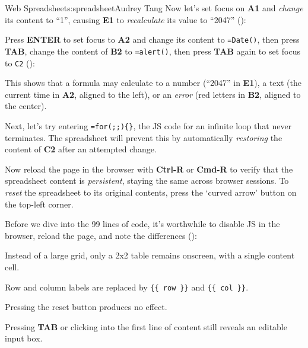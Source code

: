 \begin{aosachapter}{Web Spreadsheet}{s:spreadsheet}{Audrey Tang}
Now let's set focus on \textbf{A1} and \emph{change} its content to
``1'', causing \textbf{E1} to \emph{recalculate} its value to ``2047''
():


Press \textbf{ENTER} to set focus to \textbf{A2} and change its content
to \texttt{=Date()}, then press \textbf{TAB}, change the content of
\textbf{B2} to \texttt{=alert()}, then press \textbf{TAB} again to set
focus to \texttt{C2} ():


This shows that a formula may calculate to a number (``2047'' in
\textbf{E1}), a text (the current time in \textbf{A2}, aligned to the
left), or an \emph{error} (red letters in \textbf{B2}, aligned to the
center).

Next, let's try entering \texttt{=for(;;)\{\}}, the JS code for an
infinite loop that never terminates. The spreadsheet will prevent this
by automatically \emph{restoring} the content of \textbf{C2} after an
attempted change.

Now reload the page in the browser with \textbf{Ctrl-R} or
\textbf{Cmd-R} to verify that the spreadsheet content is
\emph{persistent}, staying the same across browser sessions. To
\emph{reset} the spreadsheet to its original contents, press the `curved
arrow' button on the top-left corner.

\label{progressive-enhancement}

Before we dive into the 99 lines of code, it's worthwhile to disable JS
in the browser, reload the page, and note the differences
():

\begin{aosaitemize}

\item
  Instead of a large grid, only a 2x2 table remains onscreen, with a
  single content cell.
\item
  Row and column labels are replaced by \texttt{\{\{ row \}\}} and
  \texttt{\{\{ col \}\}}.
\item
  Pressing the reset button produces no effect.
\item
  Pressing \textbf{TAB} or clicking into the first line of content still
  reveals an editable input box.
\end{aosaitemize}


\end{aosachapter}
